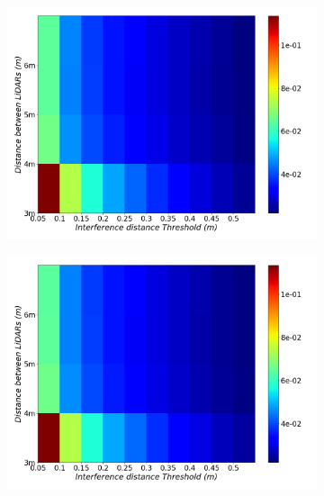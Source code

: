 \begin{figure}[!ht]
	\centering
	\begin{subfigure}[c]{0.45\textwidth}
		\centering
		\includegraphics[width=\textwidth]{img/lidar-interference/human/interference_distance_color_mesh.png}
		\caption{}
		\label{fig:human:interference-color-mesh}
	\end{subfigure}
	\qquad
	\begin{subfigure}[c]{0.45\textwidth}
		\centering
		\includegraphics[width=\textwidth]{img/lidar-interference/human/ground_truth_distance_color_mesh.png}
		\caption{}
		\label{fig:human:ground-truth-color-mesh}
	\end{subfigure}
	\\ \vspace{2mm}

\end{figure}
